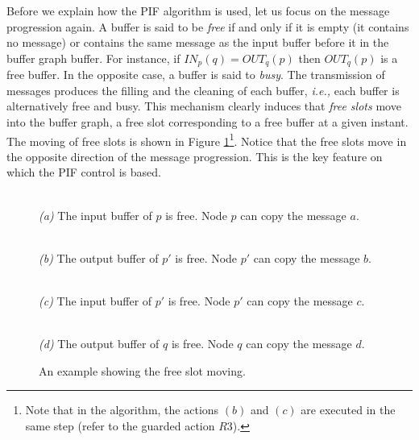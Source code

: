 \documentclass{llncs}
\newcommand{\ie}{\emph{i.e., }}
\begin{document}
Before we explain how the PIF algorithm is used, let us focus on the message progression again.
A buffer is said to be {\em free} if and only if it is empty (it contains no message) or contains the same message as
the input buffer before it in the buffer graph buffer. For instance, if $IN_{p}(q)=OUT_{q}(p)$ then $OUT_{q}(p)$ is a
free buffer. In the opposite case, a buffer is said to {\em busy}.
The transmission of messages produces the filling and the cleaning of each buffer, \ie each buffer is alternatively
free and busy. This mechanism clearly induces that {\em free slots} move into the buffer graph, a free slot
corresponding to a free buffer at a given instant. The moving of free slots is shown in Figure \ref{EmptySlot}\footnote{Note that in the
algorithm, the actions $(b)$ and $(c)$ are executed in the same step (refer to the guarded action $R3$).}.
Notice that the free slots move in the opposite direction of the message progression.  This is the key feature on
which the PIF control is based.

\begin{figure}
 \begin{minipage}[b]{.46\linewidth}
  \begin{center}
  \\
  \textit{(a)} The input buffer of $p$ is free. Node $p$ can copy the message $a$. 
  \end{center}
 \end{minipage} \hfill
 \begin{minipage}[b]{.46\linewidth}
 \begin{center}
 \\
  \textit{(b)} The output buffer of $p'$ is free. Node $p'$ can copy the message $b$.
  \end{center}
 \end{minipage}\hfill
 \begin{minipage}[b]{.46\linewidth}
\begin{center}  
  \\
  \textit{(c)} The input buffer of $p'$ is free. Node $p'$ can copy the message $c$.
  \end{center}
 \end{minipage}\hfill
 \begin{minipage}[b]{.46\linewidth}
 \begin{center}
 \\
  \textit{(d)} The output buffer of $q$ is free. Node $q$ can copy the message $d$.
  \end{center}
 \end{minipage}
 \caption{An example showing the free slot moving.\label{EmptySlot}}
\end{figure}
\end{document}
